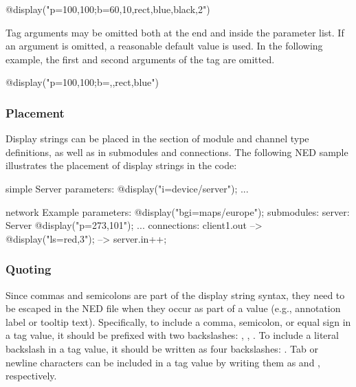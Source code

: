 \begin{ned}
@display("p=100,100;b=60,10,rect,blue,black,2")
\end{ned}

Tag arguments may be omitted both at the end and inside the parameter list. If
an argument is omitted, a reasonable default value is used. In the following
example, the first and second arguments of the  tag are omitted.

\begin{ned}
@display("p=100,100;b=,,rect,blue")
\end{ned}

\subsubsection{Placement}
\label{sec:graphics:dispstr-placement}

Display strings can be placed in the  section of module and
channel type definitions, as well as in submodules and connections. The
following NED sample illustrates the placement of display strings in the code:

\begin{ned}
simple Server
{
    parameters:
        @display("i=device/server");
    ...
}

network Example
{
    parameters:
        @display("bgi=maps/europe");
    submodules:
        server: Server {
            @display("p=273,101");
        }
        ...
    connections:
        client1.out --> { @display("ls=red,3"); } --> server.in++;
}
\end{ned}

\subsubsection{Quoting}
\label{sec:graphics:dispstr-quoting}

Since commas and semicolons are part of the display string syntax, they need to
be escaped in the NED file when they occur as part of a value (e.g., annotation
label or tooltip text). Specifically, to include a comma, semicolon, or equal
sign in a tag value, it should be prefixed with two backslashes:
\ttt{\textbackslash\textbackslash,}, \ttt{\textbackslash\textbackslash;},
\ttt{\textbackslash\textbackslash=}. To include a literal backslash in a tag
value, it should be written as four backslashes:
\ttt{{\textbackslash}{\textbackslash}{\textbackslash}{\textbackslash}}. Tab or
newline characters can be included in a tag value by writing them as
 and , respectively.

